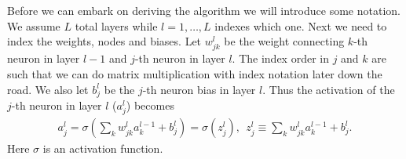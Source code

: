 \documentclass[12pt]{extarticle}
\begin{document}
Before we can embark on deriving the algorithm we will introduce some notation. We assume $L$ total layers while $l = 1, \dots , L$ indexes which one. Next we need to index the weights, nodes and biases. Let $w_{jk}^l$ be the weight connecting $k$-th neuron in layer $l-1$ and $j$-th neuron in layer $l$. The index order in $j$ and $k$ are such that we can do matrix multiplication with index notation later down the road. We also let $b_j^l$ be the $j$-th neuron bias in layer $l$. Thus the activation of the $j$-th neuron in layer $l$ ($a^l_j$) becomes
\begin{align}
	a_j^l = \sigma\left(\sum_{k} w_{jk}^l a_k^{l-1} + b_j^l\right) = \sigma(z_j^l), \ \ z_j^l \equiv \sum_{k} w_{jk}^l a_k^{l-1} + b_j^l.
	\label{eq:activation_of_node_ajl}
\end{align} 
Here $\sigma$ is an activation function.
\end{document}
